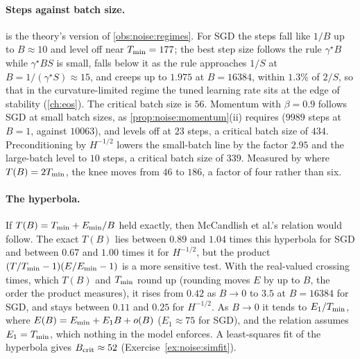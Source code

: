 \begin{refsection}
\begin{figure}[t]
\label{fig:noise:steps}
\end{figure}

\paragraph{Steps against batch size.}  is the theory's version of \cref{obs:noise:regimes}. For SGD the steps fall like $1/B$ up to $B\approx10$ and level off near $T_{\min}=177$; the best step size follows the rule $\gamma^\star B$ while $\gamma^\star BS$ is small, falls below it as the rule approaches $1/S$ at $B=1/(\gamma^\star S)\approx15$, and creeps up to $1.975$ at $B=16384$, within $1.3\%$ of $2/S$, so that in the curvature-limited regime the tuned learning rate sits at the edge of stability (\cref{ch:eos}). The critical batch size is $56$. Momentum with $\beta=0.9$ follows SGD at small batch sizes, as \cref{prop:noise:momentum}(ii) requires ($9989$ steps at $B=1$, against $10063$), and levels off at $23$ steps, a critical batch size of $434$. Preconditioning by $H^{-1/2}$ lowers the small-batch line by the factor $2.95$ and the large-batch level to $10$ steps, a critical batch size of $339$. Measured by where $T(B)=2T_{\min}$, the knee moves from $46$ to $186$, a factor of four rather than six.

\paragraph{The hyperbola.} If $T(B)=T_{\min}+E_{\min}/B$ held exactly, then McCandlish et al.'s relation would follow. The exact $T(B)$ lies between $0.89$ and $1.04$ times this hyperbola for SGD and between $0.67$ and $1.00$ times it for $H^{-1/2}$, but the product $(T/T_{\min}-1)(E/E_{\min}-1)$ is a more sensitive test. With the real-valued crossing times, which $T(B)$ and $T_{\min}$ round up (rounding moves $E$ by up to $B$, the order the product measures), it rises from $0.42$ as $B\to0$ to $3.5$ at $B=16384$ for SGD, and stays between $0.11$ and $0.25$ for $H^{-1/2}$. As $B\to0$ it tends to $E_1/T_{\min}$, where $E(B)=E_{\min}+E_1B+o(B)$ ($E_1\approx75$ for SGD), and the relation assumes $E_1=T_{\min}$, which nothing in the model enforces. A least-squares fit of the hyperbola gives $B_{\mathrm{crit}}\approx52$ (Exercise~\ref{ex:noise:simfit}).


\end{refsection}
